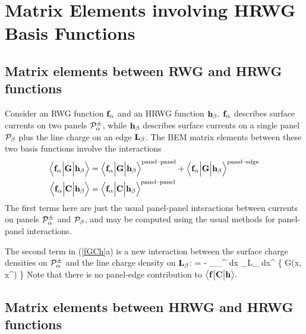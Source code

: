\documentclass[letterpaper]{article}
\begin{document}
\newpage
\section{Matrix Elements involving HRWG Basis Functions}

\subsection{Matrix elements between RWG and HRWG functions}

Consider an RWG function $\mathbf{f}_\alpha$ and an HRWG function
$\mathbf{h}_\beta.$ $\mathbf{f}_\alpha$ describes surface currents 
on two panels $\mathcal{P}_\alpha^\pm$, while $\mathbf{h}_\beta$ describes
surface currents on a single panel $\mathcal{P}_\beta$
plus the line charge on an edge $\mathbf{L}_\beta$.
The BEM matrix elements between these two basis functions
involve the interactions
\begin{subequations}
\begin{align}
  \Big\langle \mathbf{f}_\alpha \Big| \mathbf{G} \Big| \mathbf{h}_\beta \Big\rangle
&=
  \Big\langle \mathbf{f}_\alpha \Big| \mathbf{G} \Big| \mathbf{h}_\beta \Big\rangle^{\hbox{\scriptsize{panel--panel}}}
+
  \Big\langle \mathbf{f}_\alpha \Big| \mathbf{G} \Big| \mathbf{h}_\beta \Big\rangle^{\hbox{\scriptsize{panel--edge}}}
\\
  \Big\langle \mathbf{f}_\alpha \Big| \mathbf{C} \Big| \mathbf{h}_\beta \Big\rangle
&=
  \Big\langle \mathbf{f}_\alpha \Big| \mathbf{C} \Big| \mathbf{h}_\beta \Big\rangle^{\hbox{\scriptsize{panel--panel}}}
\end{align}
\label{fGCh}
\end{subequations}
The first terms here are just the usual panel-panel
interactions between currents on panels $\mathcal{P}_{\alpha}^\pm$ 
and $\mathcal{P}_\beta$, and may be computed using the usual
\lss methods for panel-panel interactions. 

The second term in (\ref{fGCh}a) is a new interaction
between the surface charge densities on $\mathcal{P}_{\alpha}^\pm$ 
and the line charge density on $\mathbf{L}_\beta$:
{
=
-
   \sum \pm
   \int_{\pan_\alpha^\pm} d\vb x
   \int_{\vb L_\beta} d\vb x^\prime
   \left\{ 
           G(\vb x, \vb x^\prime)
   \right\}
}
Note that there is no panel-edge contribution to 
$\big\langle \mathbf{f} \big| \mathbf{C} \big| \mathbf{h} \big\rangle.$

\subsection{Matrix elements between HRWG and HRWG functions}
\end{document}
